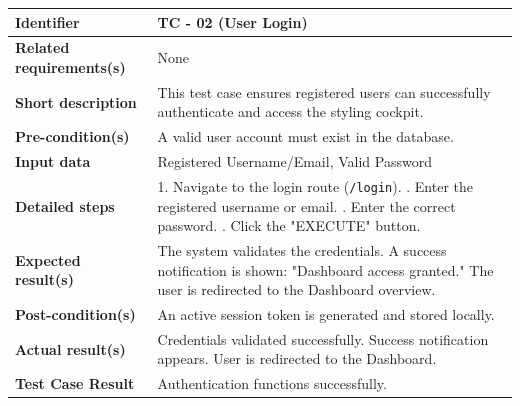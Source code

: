 \documentclass{article}
\begin{document}
\newpage

\begin{table}[h!]
\centering
\renewcommand{\arraystretch}{1.5}
\begin{tabularx}{\textwidth}{|l|X|}
\hline
\textbf{Identifier} & TC - 02 (User Login) \\ \hline
\textbf{Related requirements(s)} & None \\ \hline
\textbf{Short description} & This test case ensures registered users can successfully authenticate and access the styling cockpit. \\ \hline
\textbf{Pre-condition(s)} & A valid user account must exist in the database. \\ \hline
\textbf{Input data} & Registered Username/Email, Valid Password \\ \hline
\textbf{Detailed steps} & 
1. Navigate to the login route (\texttt{/login}). \newline
2. Enter the registered username or email. \newline
3. Enter the correct password. \newline
4. Click the "EXECUTE" button. \\ \hline
\textbf{Expected result(s)} & 
The system validates the credentials. \newline
A success notification is shown: "Dashboard access granted." \newline
The user is redirected to the Dashboard overview. \\ \hline
\textbf{Post-condition(s)} & An active session token is generated and stored locally. \\ \hline
\textbf{Actual result(s)} & 
Credentials validated successfully. \newline
Success notification appears. \newline
User is redirected to the Dashboard. \\ \hline
\textbf{Test Case Result} & Authentication functions successfully. \\ \hline
\end{tabularx}
\end{table}

\vspace{2em}
\end{document}
